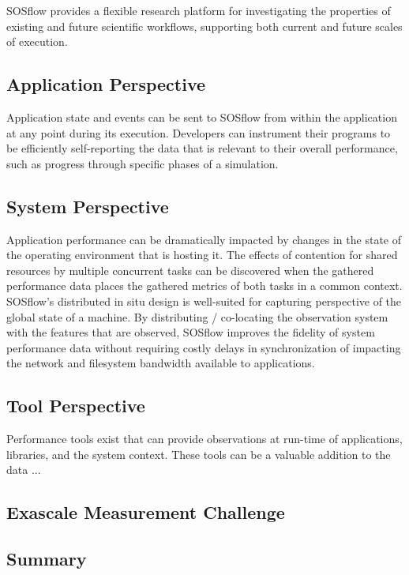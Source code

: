%
\par
%
%
SOSflow provides a flexible research platform for investigating the
properties of existing and future scientific workflows, supporting
both current and future scales of execution.
%
%
\subsection{Application Perspective} %
%
Application state and events can be sent to SOSflow from within the application
at any point during its execution.
%
Developers can instrument their programs to be efficiently self-reporting
the data that is relevant to their overall performance, such as progress
through specific phases of a simulation.
%
%
\subsection{System Perspective} %
%
Application performance can be dramatically impacted by changes in the
state of the operating environment that is hosting it.
%
The effects of contention for shared resources by multiple concurrent
tasks can be discovered when the gathered performance data places the
gathered metrics of both tasks in a common context.
%
SOSflow's distributed in situ design is well-suited for capturing
perspective of the global state of a machine.
%
By distributing / co-locating the observation system with the features
that are observed, SOSflow improves the fidelity of system performance
data without requiring costly delays in synchronization of impacting
the network and filesystem bandwidth available to applications.
%
\subsection{Tool Perspective} %
%
Performance tools exist that can provide observations at run-time
of applications, libraries, and the system context.
%
These tools can be a valuable addition to the data ...
%
\subsection{Exascale Measurement Challenge} %
%
%
\subsection{Summary} %
%
%


